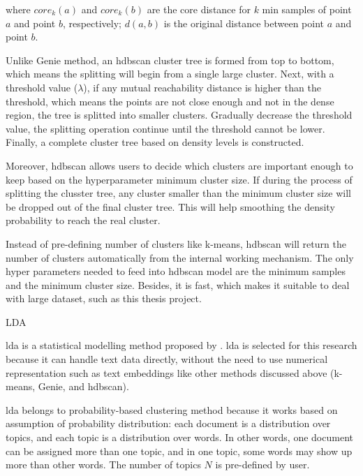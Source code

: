 \documentclass[a4paper,man,floatsintext,natbib,noextraspace]{apa6}
\makeatletter
\renewcommand{\subsubsection}{\@startsection{subsubsection}{3}
  {\z@}
  {\b@level@two@skip}
  {\e@level@two@skip}
  {\normalfont\normalsize\bfseries\itshape}}
\makeatother
\begin{document}
where $core_{k}(a)$ and $core_{k}(b)$ are the core distance for $k$ min samples of point $a$ and point $b$, respectively; $d(a,b)$ is the original distance between point $a$ and point $b$. 

Unlike Genie method, an \gls{hdbscan} cluster tree is formed from top to bottom, which means the splitting will begin from a single large cluster. Next, with a threshold value ($\lambda$), if any mutual reachability distance is higher than the threshold, which means the points are not close enough and not in the dense region, the tree is splitted into smaller clusters. Gradually decrease the threshold value, the splitting operation continue until the threshold cannot be lower. Finally, a complete cluster tree based on density levels is constructed.

Moreover, \gls{hdbscan} allows users to decide which clusters are important enough to keep based on the hyperparameter minimum cluster size. If during the process of splitting the clusster tree, any cluster smaller than the minimum cluster size will be dropped out of the final cluster tree. This will help smoothing the density probability to reach the real cluster.

Instead of pre-defining number of clusters like k-means, \gls{hdbscan} will return the number of clusters automatically from the internal working mechanism. The only hyper parameters needed to feed into \gls{hdbscan} model are the minimum samples and the minimum cluster size. Besides, it is fast, which makes it suitable to deal with large dataset, such as this thesis project.

\subsubsection{LDA}

\gls{lda} is a statistical modelling method proposed by \cite{blei2003latent}. 
\gls{lda} is selected for this research because it can handle text data directly, without the need to use numerical representation such as text embeddings like other methods discussed above (k-means, Genie, and \gls{hdbscan}). 

\gls{lda} belongs to probability-based clustering method because it works based on assumption of probability distribution: each document is a distribution over topics, and
each topic is a distribution over words. In other words, one document can be assigned more than one topic, and in one topic, some words may show up more than other words. The number of topics $N$ is pre-defined by user.
\end{document}
